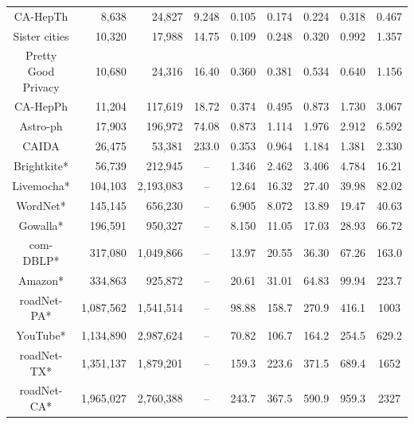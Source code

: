 \documentclass[10pt,twocolumn,twoside]{IEEEtran}
\begin{document}
\begin{table}[htbp]
\begin{threeparttable}
\begin{tabular}{crrcccccc}
            CA-HepTh                          & 8,638     & 24,827    & 9.248   & 0.105   & 0.174    & 0.224   & 0.318    & 0.467   \\
            Sister cities                     & 10,320    & 17,988    & 14.75   & 0.109   & 0.248    & 0.320   & 0.992    & 1.357   \\
            Pretty Good Privacy               & 10,680    & 24,316    & 16.40   & 0.360   & 0.381    & 0.534   & 0.640    & 1.156   \\
            CA-HepPh                          & 11,204    & 117,619   & 18.72   & 0.374   & 0.495    & 0.873   & 1.730    & 3.067   \\
            Astro-ph                          & 17,903    & 196,972   & 74.08   & 0.873   & 1.114    & 1.976   & 2.912    & 6.592   \\
            CAIDA                             & 26,475    & 53,381    & 233.0   & 0.353   & 0.964    & 1.184   & 1.381    & 2.330   \\
            Brightkite*                       & 56,739    & 212,945   & --      & 1.346   & 2.462    & 3.406   & 4.784    & 16.21   \\
            Livemocha*                        & 104,103   & 2,193,083 & --      & 12.64   & 16.32    & 27.40   & 39.98    & 82.02   \\
            WordNet*                          & 145,145   & 656,230   & --      & 6.905   & 8.072    & 13.89   & 19.47    & 40.63   \\
            Gowalla*                          & 196,591   & 950,327   & --      & 8.150   & 11.05    & 17.03   & 28.93    & 66.72   \\
            com-DBLP*                         & 317,080   & 1,049,866 & --      & 13.97   & 20.55    & 36.30   & 67.26    & 163.0   \\
            Amazon*                           & 334,863   & 925,872   & --      & 20.61   & 31.01    & 64.83   & 99.94    & 223.7   \\
            roadNet-PA*                       & 1,087,562 & 1,541,514 & --      & 98.88   & 158.7    & 270.9   & 416.1    & 1003    \\
            YouTube*                          & 1,134,890 & 2,987,624 & --      & 70.82   & 106.7    & 164.2   & 254.5    & 629.2   \\
            roadNet-TX*                       & 1,351,137 & 1,879,201 & --      & 159.3   & 223.6    & 371.5   & 689.4    & 1652    \\
            roadNet-CA*                       & 1,965,027 & 2,760,388 & --      & 243.7   & 367.5    & 590.9   & 959.3    & 2327    \\
            \bottomrule
        \end{tabular}
    \end{threeparttable}
\end{table}
\end{document}
